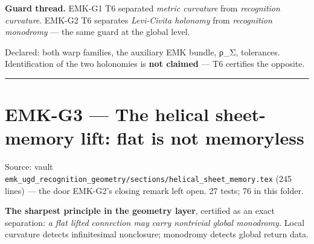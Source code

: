 \textbf{Guard thread.} EMK-G1 T6 separated \emph{metric curvature} from
\emph{recognition curvature}. EMK-G2 T6 separates \emph{Levi-Civita holonomy}
from \emph{recognition monodromy} --- the same guard at the global level.

Declared: both warp families, the auxiliary EMK bundle, ρ\_Σ,
tolerances. Identification of the two holonomies is \textbf{not claimed} ---
T6 certifies the opposite.

\begin{center}\rule{0.5\linewidth}{0.5pt}\end{center}

\hypertarget{emk-g3-the-helical-sheet-memory-lift-flat-is-not-memoryless}{%
\chapter{EMK-G3 --- The helical sheet-memory lift: flat is not memoryless}\label{emk-g3-the-helical-sheet-memory-lift-flat-is-not-memoryless}}

Source: vault \texttt{emk\_ugd\_recognition\_geometry/sections/helical\_sheet\_memory.tex}
(245 lines) --- the door EMK-G2's closing remark left open. 27 tests;
76 in this folder.

\textbf{The sharpest principle in the geometry layer}, certified as an exact
separation: \emph{a flat lifted connection may carry nontrivial global
monodromy.} Local curvature detects infinitesimal nonclosure; monodromy
detects global return data.


